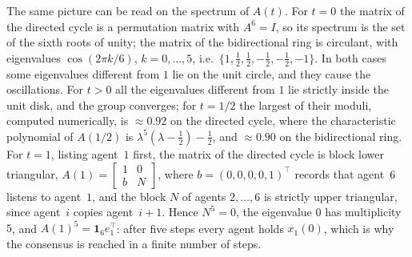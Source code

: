 The same picture can be read on the spectrum of $A(t)$. For $t = 0$ the matrix of the
directed cycle is a permutation matrix with $A^6 = I$, so its spectrum is the set of the
sixth roots of unity; the matrix of the bidirectional ring is circulant, with eigenvalues
$\cos(2\pi k/6)$, $k = 0, \dots, 5$, i.e.\
$\{1, \frac{1}{2}, \frac{1}{2}, -\frac{1}{2}, -\frac{1}{2}, -1\}$. In both cases some
eigenvalues different from $1$ lie on the unit circle, and they cause the oscillations.
For $t > 0$ all the eigenvalues different from $1$ lie strictly inside the unit disk, and
the group converges; for $t = 1/2$ the largest of their moduli, computed numerically,
is $\approx 0.92$ on the directed cycle, where the characteristic polynomial of $A(1/2)$
is $\lambda^5(\lambda - \tfrac12) - \tfrac12$, and $\approx 0.90$ on the bidirectional
ring. For $t = 1$, listing
agent~$1$ first, the matrix of the directed cycle is block lower triangular,
$A(1) = \left[\begin{smallmatrix} 1 & 0 \\ b & N \end{smallmatrix}\right]$, where
$b = (0, 0, 0, 0, 1)^\top$ records that agent~$6$ listens to agent~$1$, and the block $N$
of agents $2, \dots, 6$ is strictly upper triangular, since agent~$i$ copies
agent~$i+1$. Hence $N^5 = 0$, the eigenvalue $0$ has multiplicity $5$, and
$A(1)^5 = \mathbf{1}_6 e_1^\top$: after five steps every agent holds $x_1(0)$, which is why
the consensus is reached in a finite number of steps.
